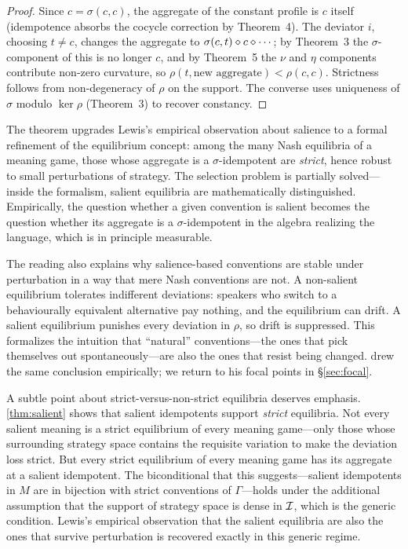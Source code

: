 \begin{proof}
Since $c=\sigma(c,c)$, the aggregate of the constant profile is $c$
itself (idempotence absorbs the cocycle correction by Theorem~4). The
deviator $i$, choosing $t\neq c$, changes the aggregate to
$\sigma(c,t)\mathbin{\diamond} c\mathbin{\diamond}\cdots$; by Theorem~3 the
$\sigma$-component of this is no longer $c$, and by Theorem~5 the
$\nu$ and $\eta$ components contribute non-zero curvature, so
$\rho(t,\text{new aggregate})<\rho(c,c)$. Strictness follows from
non-degeneracy of $\rho$ on the support. The converse uses uniqueness
of $\sigma$ modulo $\ker\rho$ (Theorem~3) to recover constancy.
\end{proof}

The theorem upgrades Lewis's empirical observation about salience to a
formal refinement of the equilibrium concept: among the many Nash
equilibria of a meaning game, those whose aggregate is a
$\sigma$-idempotent are \emph{strict}, hence robust to small
perturbations of strategy. The selection problem is partially
solved---inside the formalism, salient equilibria are mathematically
distinguished. Empirically, the question whether a given convention is
salient becomes the question whether its aggregate is a
$\sigma$-idempotent in the algebra realizing the language, which is in
principle measurable.

The reading also explains why salience-based conventions are stable
under perturbation in a way that mere Nash conventions are not. A
non-salient equilibrium tolerates indifferent deviations: speakers who
switch to a behaviourally equivalent alternative pay nothing, and the
equilibrium can drift. A salient equilibrium punishes every deviation
in $\rho$, so drift is suppressed. This formalizes the intuition that
``natural'' conventions---the ones that pick themselves out
spontaneously---are also the ones that resist being changed.
\cite{Schelling1960} drew the same conclusion empirically; we return to
his focal points in \S\ref{sec:focal}.

A subtle point about strict-versus-non-strict equilibria deserves
emphasis. \cref{thm:salient} shows that salient idempotents support
\emph{strict} equilibria. Not every salient meaning is a strict
equilibrium of every meaning game---only those whose surrounding
strategy space contains the requisite variation to make the deviation
loss strict. But every strict equilibrium of every meaning game has
its aggregate at a salient idempotent. The biconditional that this
suggests---salient idempotents in $M$ are in bijection with strict
conventions of $\Gamma$---holds under the additional assumption that
the support of strategy space is dense in $\mathcal{I}$, which is the
generic condition. Lewis's empirical observation that the salient
equilibria are also the ones that survive perturbation is recovered
exactly in this generic regime.

